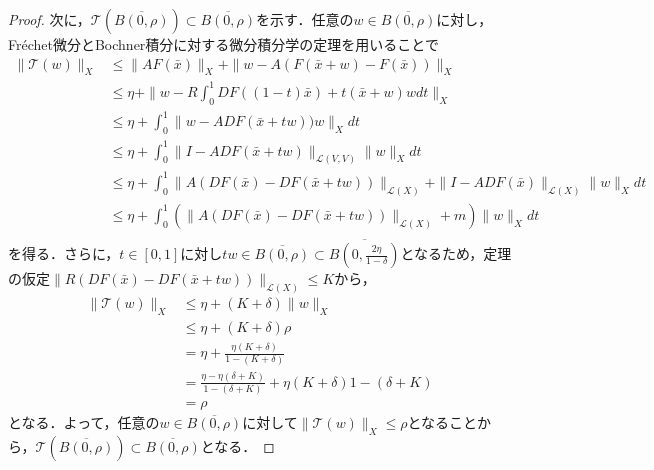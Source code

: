 \documentclass[11pt,a4paper]{jsarticle}
\theoremstyle{definition}
\begin{document}
\begin{proof}
  次に，$\mathcal{T}(\overline{B(0,\rho)}) \subset \overline{B(0,\rho)}$を示す．任意の$w\in \overline{B(0,\rho)}$に対し，Fr\'{e}chet微分とBochner積分に対する微分積分学の定理を用いることで
  \begin{align*}
    \|\mathcal{T}(w)\|_X & \leq \|AF(\bar{x})\|_X + \|w-A(F(\bar{x}+w)-F(\bar{x}))\|_X                                                             \\
                         & \leq \eta + \|w - R\int_0^1 DF((1-t)\bar{x})+t(\bar{x}+w)wdt\|_X                                                        \\
                         & \leq \eta + \int_0^1 \|w - ADF(\bar{x}+tw))w\|_X dt                                                                     \\
                         & \leq \eta + \int_0^1 \|I - ADF(\bar{x}+tw)\|_{\mathcal{L}(V,V)}\|w\|_X dt                                               \\
                         & \leq \eta + \int_0^1 \|A(DF(\bar{x})-DF(\bar{x}+tw))\|_{\mathcal{L}(X)} + \|I-ADF(\bar{x})\|_{\mathcal{L}(X)}\|w\|_X dt \\
                         & \leq \eta + \int_0^1 (\|A(DF(\bar{x})-DF(\bar{x}+tw))\|_{\mathcal{L}(X)} +m) \|w\|_{X}dt                                \\
  \end{align*}
  を得る．さらに，$t\in[0,1]$に対し$tw\in\overline{B(0,\rho)}\subset\overline{B\left(0,\frac{2\eta}{1-\delta}\right)}$となるため，定理の仮定$\|R(DF(\bar{x})-DF(\bar{x}+tw))\|_{\mathcal{L}(X)}\leq K$から，
  \begin{align*}
    \|\mathcal{T}(w)\|_X & \leq \eta + (K+\delta)\|w\|_X                                             \\
                         & \leq \eta + (K+\delta)\rho                                                \\
                         & = \eta + \frac{\eta(K+\delta)}{1-(K+\delta)}                              \\
                         & = \frac{\eta-\eta(\delta+K)}{1-(\delta+K)}+{\eta(K+\delta)}{1-(\delta+K)} \\
                         & = \rho
  \end{align*}
  となる．よって，任意の$w\in \overline{B(0,\rho)}$に対して$\|\mathcal{T}(w)\|_X \leq \rho$となることから，$\mathcal{T}\left(\overline{B(0,\rho)}\right) \subset \overline{B(0,\rho)}$となる．


\end{proof}
\end{document}
